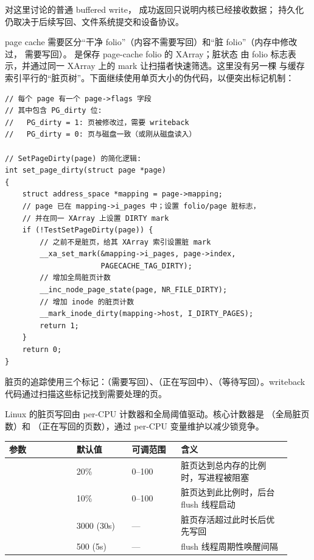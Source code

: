 \begin{filesystemlayout}
对这里讨论的普通 buffered write， 成功返回只说明内核已经接收数据；
持久化仍取决于后续写回、文件系统提交和设备协议。


page cache 需要区分“干净 folio”（内容不需要写回）和“脏 folio”（内存中修改过，
需要写回）。 是保存 page-cache folio 的 XArray；脏状态
由 folio 标志表示，并通过同一 XArray 上的 mark 让扫描者快速筛选。这里没有另一棵
与缓存索引平行的“脏页树”。下面继续使用单页大小的伪代码，以便突出标记机制：

\begin{lstlisting}
// 每个 page 有一个 page->flags 字段
// 其中包含 PG_dirty 位:
//   PG_dirty = 1: 页被修改过，需要 writeback
//   PG_dirty = 0: 页与磁盘一致（或刚从磁盘读入）

// SetPageDirty(page) 的简化逻辑:
int set_page_dirty(struct page *page)
{
    struct address_space *mapping = page->mapping;
    // page 已在 mapping->i_pages 中；设置 folio/page 脏标志，
    // 并在同一 XArray 上设置 DIRTY mark
    if (!TestSetPageDirty(page)) {
        // 之前不是脏页，给其 XArray 索引设置脏 mark
        __xa_set_mark(&mapping->i_pages, page->index,
                      PAGECACHE_TAG_DIRTY);
        // 增加全局脏页计数
        __inc_node_page_state(page, NR_FILE_DIRTY);
        // 增加 inode 的脏页计数
        __mark_inode_dirty(mapping->host, I_DIRTY_PAGES);
        return 1;
    }
    return 0;
}
\end{lstlisting}

脏页的追踪使用三个标记：（需要写回）、（正在写回中）、（等待写回）。writeback 代码通过扫描这些标记找到需要处理的页。


Linux 的脏页写回由 per-CPU 计数器和全局阈值驱动。核心计数器是 （全局脏页数）和 （正在写回的页数），通过 per-CPU 变量维护以减少锁竞争。

\begin{longtable}{|F{0.22\linewidth}|F{0.18\linewidth}|F{0.16\linewidth}|F{0.36\linewidth}|}
\toprule
{}
参数 & 默认值 & 可调范围 & 含义 \\
\midrule
{} & 20\% & 0--100 & 脏页达到总内存的比例时，写进程被阻塞 \\\tablerowrule
{} & 10\% & 0--100 & 脏页达到此比例时，后台 flush 线程启动 \\\tablerowrule
{} & 3000 (30s) & --- & 脏页存活超过此时长后优先写回 \\\tablerowrule
{} & 500 (5s) & --- & flush 线程周期性唤醒间隔 \\
\bottomrule
\end{longtable}


\end{filesystemlayout}
